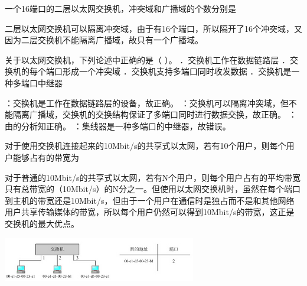 \question 一个16端口的二层以太网交换机，冲突域和广播域的个数分别是
\par{}
\begin{solution}二层以太网交换机可以隔离冲突域，由于有16个端口，所以隔开了16个冲突域，又因为二层交换机不能隔离广播域，故只有一个广播域。
\end{solution}
\question 关于以太网交换机，下列论述中正确的是（ ）。 ．交换机工作在数据链路层
．交换机的每个端口形成一个冲突域 ．交换机支持多端口同时收发数据
．交换机是一种多端口中继器
\par{}
\begin{solution}：交换机是工作在数据链路层的设备，故正确。
：交换机可以隔离冲突域，但不能隔离广播域，交换机的交换结构保证了多端口同时进行数据交换，故正确。
：由的分析知正确。 ：集线器是一种多端口的中继器，故错误。
\end{solution}
\question 对于使用交换机连接起来的10Mbit/s的共享式以太网，若有10个用户，则每个用户能够占有的带宽为
\par{}
\begin{solution}对于普通的10Mbit/s的共享式以太网，若有N个用户，则每个用户占有的平均带宽只有总带宽的（10Mbit/s）的N分之一。但使用以太网交换机时，虽然在每个端口到主机的带宽还是10Mbit/s，但由于一个用户在通信时是独占而不是和其他网络用户共享传输媒体的带宽，所以每个用户仍然可以得到10Mbit/s的带宽，这正是交换机的最大优点。
\end{solution}
\question \includegraphics[width=3.33333in,height=0.76042in]{computerassets/197693a2bdb2a370018c7838bc839d05.jpeg}~

